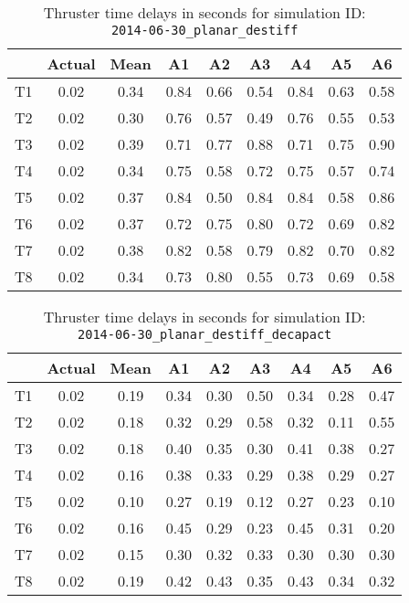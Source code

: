 \begin{table}[H]
\centering
\cprotect\caption{Thruster time delays in seconds for simulation ID:\\
\verb|2014-06-30_planar_destiff|}
\begin{tabular}{|c|c|c|c|c|c|c|c|c|} \hline
~ & Actual & Mean & A1 & A2 & A3 & A4 & A5 & A6 \\ \hline
T1 & 0.02 & 0.34 & 0.84 & 0.66 & 0.54 & 0.84 & 0.63 & 0.58 \\
T2 & 0.02 & 0.30 & 0.76 & 0.57 & 0.49 & 0.76 & 0.55 & 0.53 \\
T3 & 0.02 & 0.39 & 0.71 & 0.77 & 0.88 & 0.71 & 0.75 & 0.90 \\
T4 & 0.02 & 0.34 & 0.75 & 0.58 & 0.72 & 0.75 & 0.57 & 0.74 \\
T5 & 0.02 & 0.37 & 0.84 & 0.50 & 0.84 & 0.84 & 0.58 & 0.86 \\
T6 & 0.02 & 0.37 & 0.72 & 0.75 & 0.80 & 0.72 & 0.69 & 0.82 \\
T7 & 0.02 & 0.38 & 0.82 & 0.58 & 0.79 & 0.82 & 0.70 & 0.82 \\
T8 & 0.02 & 0.34 & 0.73 & 0.80 & 0.55 & 0.73 & 0.69 & 0.58 \\ \hline
\end{tabular}
\label{delay-2}
\end{table}

\begin{table}[H]
\centering
\cprotect\caption{Thruster time delays in seconds for simulation ID:\\
\verb|2014-06-30_planar_destiff_decapact|}
\begin{tabular}{|c|c|c|c|c|c|c|c|c|} \hline
~ & Actual & Mean & A1 & A2 & A3 & A4 & A5 & A6 \\ \hline
T1 & 0.02 & 0.19 & 0.34 & 0.30 & 0.50 & 0.34 & 0.28 & 0.47 \\
T2 & 0.02 & 0.18 & 0.32 & 0.29 & 0.58 & 0.32 & 0.11 & 0.55 \\
T3 & 0.02 & 0.18 & 0.40 & 0.35 & 0.30 & 0.41 & 0.38 & 0.27 \\
T4 & 0.02 & 0.16 & 0.38 & 0.33 & 0.29 & 0.38 & 0.29 & 0.27 \\
T5 & 0.02 & 0.10 & 0.27 & 0.19 & 0.12 & 0.27 & 0.23 & 0.10 \\
T6 & 0.02 & 0.16 & 0.45 & 0.29 & 0.23 & 0.45 & 0.31 & 0.20 \\
T7 & 0.02 & 0.15 & 0.30 & 0.32 & 0.33 & 0.30 & 0.30 & 0.30 \\
T8 & 0.02 & 0.19 & 0.42 & 0.43 & 0.35 & 0.43 & 0.34 & 0.32 \\ \hline
\end{tabular}
\label{delay-3}
\end{table}

